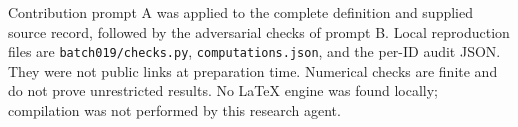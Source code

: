 \documentclass[11pt]{article}
\begin{document}
Contribution prompt A was applied to the complete definition and supplied source record, followed by the adversarial checks of prompt B. Local reproduction files are \texttt{batch019/checks.py}, \texttt{computations.json}, and the per-ID audit JSON. They were not public links at preparation time. Numerical checks are finite and do not prove unrestricted results. No LaTeX engine was found locally; compilation was not performed by this research agent.
\end{document}
